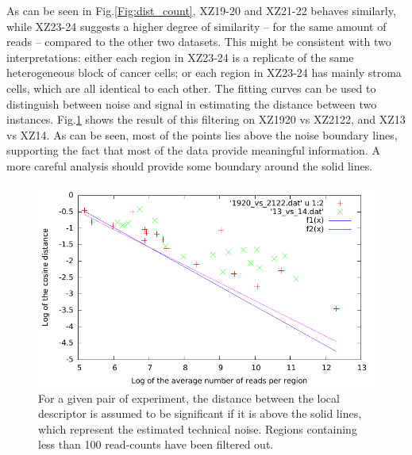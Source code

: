 \documentclass[11pt,a4paper]{article}
\begin{document}
As can be seen in Fig.\ref{Fig:dist_count}, XZ19-20 and XZ21-22 behaves similarly, while XZ23-24 suggests a higher degree of similarity -- for the same amount of reads -- compared to the other two datasets. This might be consistent with two interpretations: either each region in XZ23-24 is a replicate of the same heterogeneous block of cancer cells; or each region in XZ23-24 has mainly stroma cells, which are all identical to each other. The fitting curves can be used to distinguish between noise and signal in estimating the distance between two instances. Fig.\ref{Fig:filter_noise} shows the result of this filtering on XZ1920 vs XZ2122, and XZ13 vs XZ14. As can be seen, most of the points lies above the noise boundary lines, supporting the fact that most of the data provide meaningful information. A more careful analysis should provide some boundary around the solid lines.

\begin{figure}[hbtp]
\centering
\includegraphics[scale=1]{filter_noise.pdf}
\caption{For a given pair of experiment, the distance between the local descriptor is assumed to be significant if it is above the solid lines, which represent the estimated technical noise. Regions containing less than 100 read-counts have been filtered out.}
\label{Fig:filter_noise}
\end{figure}
\end{document}
